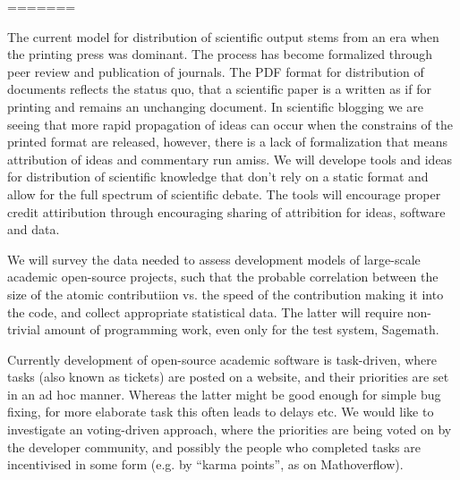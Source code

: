 \begin{workpackage}[id=social-aspects,wphases=1-48!.5,
  title=Social Aspects,
<<<<<<< HEAD
=======
  lead=UO,
>>>>>>> e490abbfa8a91427570f1a7695a6a95cd4610713
  UORM=1,USHRM=8]
=======
\begin{tasklist}
\begin{task}[title=Modern Distribution of Scientific Output]
  The current model for distribution of scientific output stems from an era when the printing press was dominant. The process has become formalized through peer review and publication of journals. The PDF format for distribution of documents reflects the status quo, that a scientific paper is a written as if for printing and remains an unchanging document. In scientific blogging we are seeing that more rapid propagation of ideas can occur when the constrains of the printed format are released, however, there is a lack of formalization that means attribution of ideas and commentary run amiss. We will develope tools and ideas for distribution of scientific knowledge that don't rely on a static format and allow for the full spectrum of scientific debate. The tools will encourage proper credit attiribution through encouraging sharing of attribition for ideas, software and data.
\end{task}

\begin{task}[title=Survey and collection of needed data,id=datacollection]
We will survey the data needed to assess development models of 
large-scale academic open-source projects, 
such that the probable correlation between the size of the atomic contributiion
vs. the speed of the contribution making it into the code, 
and collect appropriate statistical data. The latter will require non-trivial
amount of programming work, even only for the test system, Sagemath.
\end{task}

\begin{task}[title=Collective decision making in developement,id=decisionmaking]
Currently development of open-source academic software is task-driven, where tasks (also
known as tickets) are posted on a website, and their priorities are set in an ad hoc manner.
Whereas the latter might be good enough for simple bug fixing, for more elaborate task this
often leads to delays etc.
We would like to investigate an voting-driven approach, where the priorities are being
voted on by the developer community, and possibly the people who completed tasks
are incentivised in some form (e.g. by ``karma points'', as on Mathoverflow).
\end{task}


\end{tasklist}
\end{workpackage}
